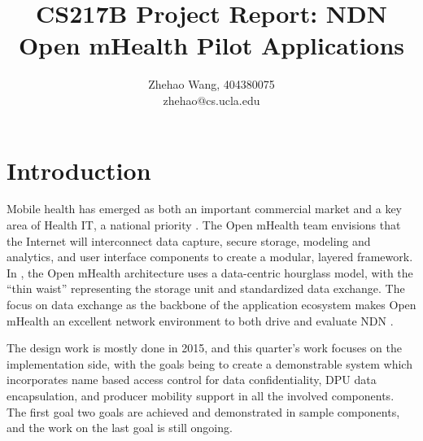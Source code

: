 \documentclass[letterpaper,twocolumn,11pt]{article}
\begin{document}
\date{}

\title{\Large \bf CS217B Project Report: NDN Open mHealth Pilot Applications}

\author{
{\rm Zhehao Wang, 404380075}\\
zhehao@cs.ucla.edu
} %

\maketitle

\thispagestyle{empty}

\section{Introduction}

Mobile health has emerged as both an important commercial market and a key area of Health IT, a national priority \cite{JeffBTechReport}.
The Open mHealth team envisions that the Internet will interconnect data capture, secure storage, modeling and analytics, and user interface components to create a modular, layered framework. In \cite{SimEstrin2010}, the Open mHealth architecture uses a data-centric hourglass model, with the ``thin waist'' representing the storage unit and standardized data exchange. The focus on data exchange as the backbone of the application ecosystem makes Open mHealth an excellent network environment to both drive and evaluate NDN \cite{NPTechReport}.


The design work is mostly done in 2015, and this quarter's work focuses on the implementation side, with the goals being to create a demonstrable system which incorporates name based access control for data confidentiality, DPU data encapsulation, and producer mobility support in all the involved components. The first goal two goals are achieved and demonstrated in sample components, and the work on the last goal is still ongoing.
\end{document}

